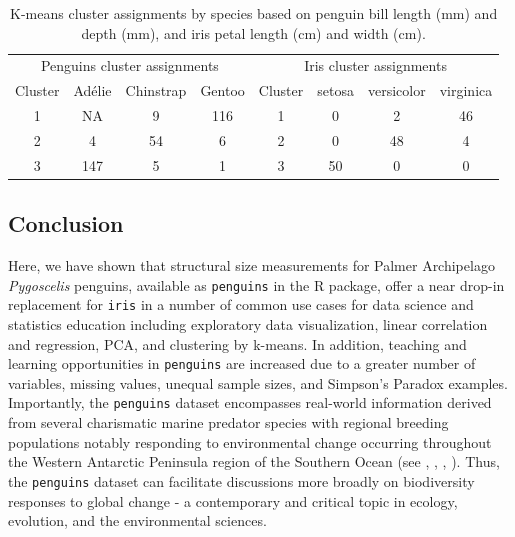 \begin{Schunk}
\begin{table}

\caption{\label{tab:kmeans}K-means cluster assignments by species based on penguin bill length (mm) and depth (mm), and iris petal length (cm) and width (cm).}
\centering
\begin{tabular}[t]{cccccccc}
\toprule
\multicolumn{4}{c}{Penguins cluster assignments} & \multicolumn{4}{c}{Iris cluster assignments} \\
\cmidrule(l{3pt}r{3pt}){1-4} \cmidrule(l{3pt}r{3pt}){5-8}
Cluster & Adélie & Chinstrap & Gentoo & Cluster & setosa & versicolor & virginica\\
\midrule
1 & NA & 9 & 116 & 1 & 0 & 2 & 46\\
2 & 4 & 54 & 6 & 2 & 0 & 48 & 4\\
3 & 147 & 5 & 1 & 3 & 50 & 0 & 0\\
\bottomrule
\end{tabular}
\end{table}

\end{Schunk}

\hypertarget{conclusion}{%
\subsection{Conclusion}\label{conclusion}}

Here, we have shown that structural size measurements for Palmer
Archipelago \emph{Pygoscelis} penguins, available as \texttt{penguins}
in the  R package, offer a near drop-in
replacement for \texttt{iris} in a number of common use cases for data
science and statistics education including exploratory data
visualization, linear correlation and regression, PCA, and clustering by
k-means. In addition, teaching and learning opportunities in
\texttt{penguins} are increased due to a greater number of variables,
missing values, unequal sample sizes, and Simpson's Paradox examples.
Importantly, the \texttt{penguins} dataset encompasses real-world
information derived from several charismatic marine predator species
with regional breeding populations notably responding to environmental
change occurring throughout the Western Antarctic Peninsula region of
the Southern Ocean (see \citet{bestelmeyer_analysis_2011},
\citet{gorman_ecological_2014}, \citet{gorman_population_2017},
\citet{gorman_advancing_2021}). Thus, the \texttt{penguins} dataset can
facilitate discussions more broadly on biodiversity responses to global
change - a contemporary and critical topic in ecology, evolution, and
the environmental sciences.

